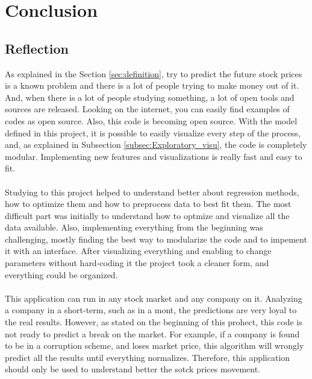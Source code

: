 \section{Conclusion}
\label{sec:conclusion}




\subsection{Reflection}
As explained in the Section \ref{sec:definition}, try to predict the future stock prices is a known problem and there is a lot of people trying to make money out of it. And, when there is a lot
of people studying something, a lot of open tools and sources are released. Looking on the internet, you can easily find examples of codes as open source. Also, this code is becoming open source.
With the model defined in this project, it is possible to easily visualize every step of the process, and, as explained in Subsection \ref{subsec:Exploratory_visu}, the code is completely modular.
Implementing new features and visualizations is really fast and easy to fit.\\
\\
Studying to this project helped to understand better about regression methods, how to optimize them and how to preprocess data to best fit them. The most difficult part was initially to understand
how to optmize and visualize all the data available. Also, implementing everything from the beginning was challenging, mostly finding the best way to modularize the code and to impement it with 
an interface. After visualizing everything and enabling to change parameters without hard-coding it the project took a cleaner form, and everything could be organized.\\
\\
This application can run in any stock market and any company on it. Analyzing a company in a short-term, such as in a mont, the predictions are very loyal to the real results. However, as stated on
the beginning of this prohect, this code is not ready to predict a break on the market. For example, if a company is found to be in a corruption scheme, and loses market price, this algorithm will 
wrongly predict all the results until everything normalizes. Therefore, this application should only be used to understand better the sotck prices movement. 

